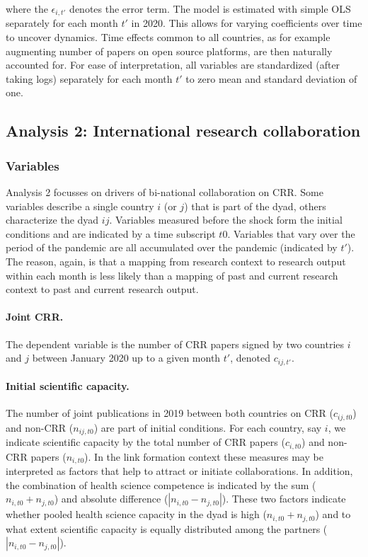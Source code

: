 where the $\epsilon_{i,t'}$ denotes the error term. The model is estimated with simple OLS separately for each month $t'$ in 2020. This allows for varying coefficients over time to uncover dynamics. Time effects common to all countries, as for example augmenting number of papers on open source platforms, are then naturally accounted for. For ease of interpretation, all variables are standardized (after taking logs) separately for each month $t'$ to zero mean and standard deviation of one.


\subsection{Analysis 2: International research collaboration}
\label{subsec:Analysis2}

\subsubsection{Variables}

Analysis 2 focusses on drivers of bi-national collaboration on CRR. Some variables describe a single country $i$ (or $j$) that is part of the dyad, others characterize the dyad $ij$. Variables measured before the shock form the initial conditions and are indicated by a time subscript $t0$. Variables that vary over the period of the pandemic are all accumulated over the pandemic (indicated by $t'$). The reason, again, is that a mapping from research context to research output within each month is less likely than a mapping of past and current research context to past and current research output. 

\paragraph{Joint CRR.} The dependent variable is the number of CRR papers signed by two countries $i$ and $j$ between January 2020 up to a given month $t'$, denoted $c_{ij,t'}$. 

\paragraph{Initial scientific capacity.} The number of joint publications in 2019 between both countries on CRR ($c_{ij,t0}$) and non-CRR ($n_{ij,t0}$) are part of initial conditions. For each country, say $i$, we indicate scientific capacity by the total number of CRR papers ($c_{i,t0}$) and non-CRR papers ($n_{i,t0}$). In the link formation context these measures may be interpreted as factors that help to attract or initiate collaborations. In addition, the combination of health science competence is indicated by the sum ($n_{i,t0} + n_{j,t0}$) and absolute difference ($|n_{i,t0} - n_{j,t0}|$). These two factors indicate whether pooled health science capacity in the dyad is high ($n_{i,t0} + n_{j,t0}$) and to what extent scientific capacity is equally distributed among the partners ($|n_{i,t0} - n_{j,t0}|$).

